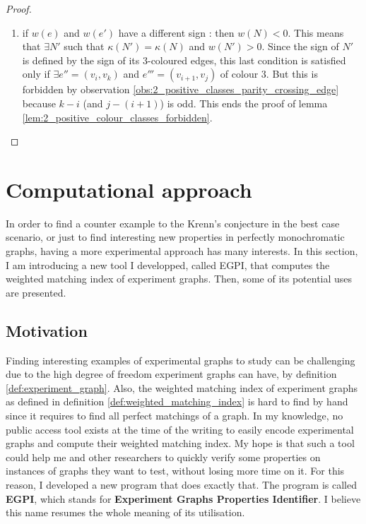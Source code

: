 \begin{proof}
\begin{enumerate}
        \item if $w(e)$ and $w(e')$ have a different sign : then $w(N) < 0$. This means that $\exists N'$ such that $\kappa(N') = \kappa(N)$ and $w(N') > 0$. Since the sign of $N'$ is defined by the sign of its $3$-coloured edges, this last condition is satisfied only if $\exists e'' = (v_i, v_k)$ and $e''' = (v_{i+1}, v_j)$ of colour $3$. But this is forbidden by observation \ref{obs:2_positive_classes_parity_crossing_edge} because $k - i$ (and $j - (i + 1)$) is odd. This ends the proof of lemma \ref{lem:2_positive_colour_classes_forbidden}.
    \end{enumerate}

\end{proof}


\section{Computational approach}
\label{sec:computational_approach}

In order to find a counter example to the Krenn's conjecture in the best case scenario, or just to find interesting new properties in perfectly monochromatic graphs, having a more experimental approach has many interests. In this section, I am introducing a new tool I developped, called EGPI, that computes the weighted matching index of experiment graphs. Then, some of its potential uses are presented.

\subsection{Motivation}
\label{sec:computational_motivations}

Finding interesting examples of experimental graphs to study can be challenging due to the high degree of freedom experiment graphs can have, by definition \ref{def:experiment_graph}. Also, the weighted matching index of experiment graphs as defined in definition \ref{def:weighted_matching_index} is hard to find by hand since it requires to find all perfect matchings of a graph. In my knowledge, no public access tool exists at the time of the writing to easily encode experimental graphs and compute their weighted matching index. My hope is that such a tool could help me and other researchers to quickly verify some properties on instances of graphs they want to test, without losing more time on it. For this reason, I developed a new program that does exactly that. The program is called \textbf{EGPI}, which stands for \textbf{Experiment Graphs Properties Identifier}. I believe this name resumes the whole meaning of its utilisation.

